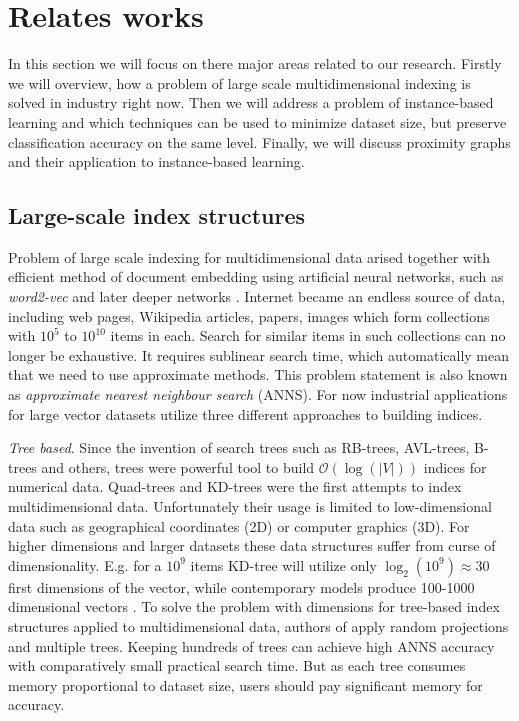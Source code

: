 \section{Relates works}\label{sec:OVERVIEW}

In this section we will focus on there major areas related to our research. Firstly we will overview, how a problem of large scale multidimensional indexing is solved in industry right now. Then we will address a problem of instance-based learning and which techniques can be used to minimize dataset size, but preserve classification accuracy on the same level. Finally, we will discuss proximity graphs and their application to instance-based learning.

\subsection{Large-scale index structures}

Problem of large scale indexing for multidimensional data arised together with efficient method of document embedding using artificial neural networks, such as \emph{word2-vec} \cite{word2vec} and later deeper networks \cite{dssm}\cite{bert}. Internet became an endless source of data, including web pages, Wikipedia articles, papers, images which form collections with $10^5$ to $10^{10}$ items in each. 
Search for similar items in such collections can no longer be exhaustive. It requires sublinear search time, which automatically mean that we need to use approximate methods.
This problem statement is also known as \emph{approximate nearest neighbour search} (ANNS).
For now industrial applications for large vector datasets utilize three different approaches to building indices.

\emph{Tree based}. Since the invention of search trees such as RB-trees, AVL-trees, B-trees and others, trees were powerful tool to build $\mathcal{O}(\log(|V|))$ indices for numerical data. Quad-trees \cite{quadtrees} and KD-trees \cite{kdtree} were the first attempts to index multidimensional data. Unfortunately their usage is limited to low-dimensional data such as geographical coordinates (2D) or computer graphics (3D).
For higher dimensions and larger datasets these data structures suffer from curse of dimensionality. E.g. for a $10^9$ items KD-tree will utilize only 
$\log_2(10^9)\approx 30$ first dimensions of the vector, while contemporary models produce 100-1000 dimensional vectors \cite{bert}.
To solve the problem with dimensions for tree-based index structures applied to multidimensional data, authors of \cite{annoy} apply random projections and multiple trees. Keeping hundreds of trees can achieve high ANNS accuracy with comparatively small practical search time. But as each tree consumes memory proportional to dataset size, users should pay significant memory for accuracy.

